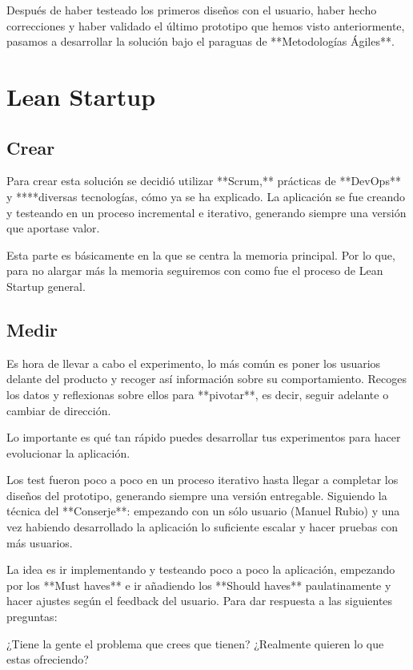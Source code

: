 \documentclass[12pt,twoside,titlepage]{report}
\begin{document}
Después de haber testeado los primeros diseños con el usuario, haber hecho correcciones y haber validado el último prototipo que hemos visto anteriormente, pasamos a desarrollar la solución bajo el paraguas de **Metodologías Ágiles**.

\section{Lean Startup}

\subsection{Crear}

Para crear esta solución se decidió utilizar **Scrum,** prácticas de **DevOps** y ****diversas tecnologías, cómo ya se ha explicado. La aplicación se fue creando y testeando en un proceso incremental e iterativo, generando siempre una versión que aportase valor.

Esta parte es básicamente en la que se centra la memoria principal. Por lo que, para no alargar más la memoria seguiremos con como fue el proceso de Lean Startup general.

\subsection{Medir}

Es hora de llevar a cabo el experimento, lo más común es poner los usuarios delante del producto y recoger así información sobre su comportamiento. Recoges los datos y reflexionas sobre ellos para **pivotar**, es decir, seguir adelante o cambiar de dirección. 

Lo importante es qué tan rápido puedes desarrollar tus experimentos para hacer evolucionar la aplicación. 

Los test fueron poco a poco en un proceso iterativo hasta llegar a completar los diseños del prototipo, generando siempre una versión entregable. Siguiendo la técnica del **Conserje**: empezando con un sólo usuario (Manuel Rubio) y una vez habiendo desarrollado la aplicación lo suficiente escalar y hacer pruebas con más usuarios.

La idea es ir implementando y testeando poco a poco la aplicación, empezando por los **Must haves** e ir añadiendo los **Should haves** paulatinamente y hacer ajustes según el feedback del usuario. Para dar respuesta a las siguientes preguntas:

¿Tiene la gente el problema que crees que tienen? ¿Realmente quieren lo que estas ofreciendo?
\end{document}
